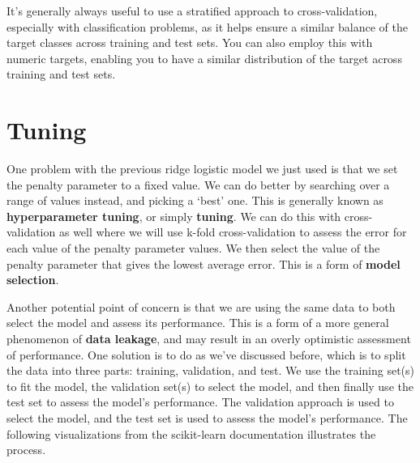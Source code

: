 \documentclass[
  letterpaper,
]{krantz}
\begin{document}
\begin{tcolorbox}[enhanced jigsaw, toprule=.15mm, colback=white, breakable, rightrule=.15mm, arc=.35mm, bottomrule=.15mm, opacityback=0, colframe=quarto-callout-tip-color-frame, leftrule=.75mm, left=2mm]
\begin{minipage}[t]{5.5mm}
\textcolor{quarto-callout-tip-color}{\faLightbulb}
\end{minipage}%
\begin{minipage}[t]{\textwidth - 5.5mm}

It's generally always useful to use a stratified approach to
cross-validation, especially with classification problems, as it helps
ensure a similar balance of the target classes across training and test
sets. You can also employ this with numeric targets, enabling you to
have a similar distribution of the target across training and test sets.

\end{minipage}%
\end{tcolorbox}

\section{Tuning}\label{sec-ml-tuning}

One problem with the previous ridge logistic model we just used is that
we set the penalty parameter to a fixed value. We can do better by
searching over a range of values instead, and picking a `best' one. This
is generally known as \textbf{hyperparameter tuning}, or simply
\textbf{tuning}. We can do this with cross-validation as well where we
will use k-fold cross-validation to assess the error for each value of
the penalty parameter values. We then select the value of the penalty
parameter that gives the lowest average error. This is a form of
\textbf{model selection}.

Another potential point of concern is that we are using the same data to
both select the model and assess its performance. This is a form of a
more general phenomenon of \textbf{data leakage}, and may result in an
overly optimistic assessment of performance. One solution is to do as
we've discussed before, which is to split the data into three parts:
training, validation, and test. We use the training set(s) to fit the
model, the validation set(s) to select the model, and then finally use
the test set to assess the model's performance. The validation approach
is used to select the model, and the test set is used to assess the
model's performance. The following visualizations from the scikit-learn
documentation illustrates the process.
\end{document}
